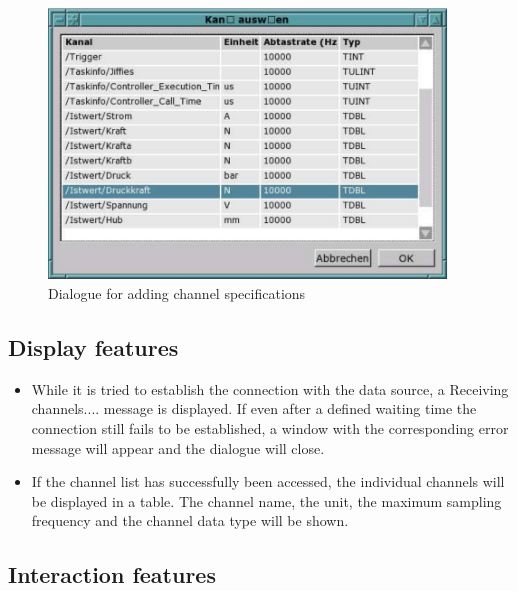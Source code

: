 \documentclass[a4paper,12pt,BCOR6mm,bibtotoc,idxtotoc]{scrbook}
\begin{document}
\begin{figure}[tbh] \begin{center} \includegraphics[width=300pt]{bilder/ctl_add} \end{center} \caption{Dialogue for adding channel specifications} \label{fig:dls_ctl_add} \end{figure}


\subsection{Display features}

\begin{itemize} 
\item While it is tried to establish the connection with the data source, a \glqq Receiving channels...\grqq.  message is displayed. If even after a defined waiting time the connection still fails to be established, a window with the corresponding error message will appear and the dialogue will close. 
\item If the channel list has successfully been accessed, the individual channels will be displayed in a table. The channel name, the unit, the maximum sampling frequency and the channel data type will be shown. \end{itemize}


\subsection{Interaction features}
\end{document}
